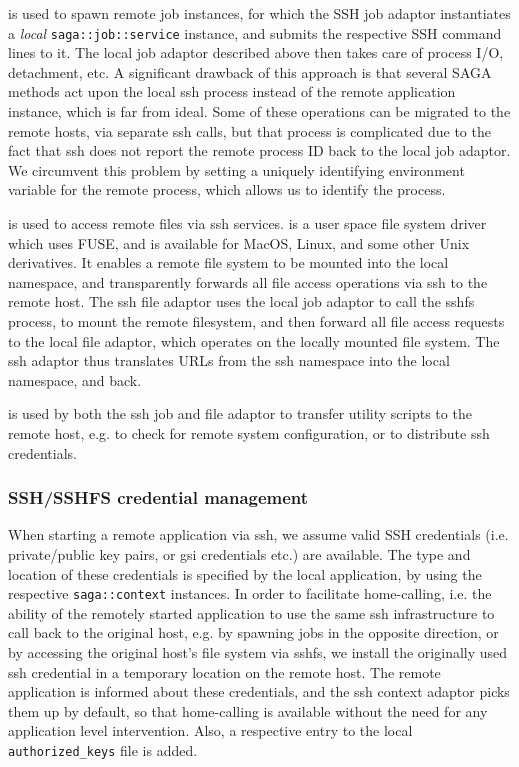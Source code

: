 \documentclass[3p,twocolumn]{elsarticle}
\newcommand{\T}[1]{\texttt{#1}}
\newcommand{\I}[1]{\textit{#1}}
\newcommand{\ssh}[1]{\texttt{ssh}}
\newcommand{\scp}[1]{\texttt{scp}}
\newcommand{\sshfs}[1]{\texttt{sshfs}}
\begin{document}
{\texttt{\ssh}} is used to spawn remote job instances, for which the
SSH job adaptor instantiates a \I{local} \T{saga::job::service}
instance, and submits the respective SSH command lines to it.  The
local job adaptor described above then takes care of process I/O,
detachment, etc.  A significant drawback of this approach is that
several SAGA methods act upon the local ssh process instead of the
remote application instance, which is far from ideal. Some of these
operations can be migrated to the remote hosts, via separate ssh
calls, but that process is complicated due to the fact that ssh does
not report the remote process ID back to the local job adaptor.  We
circumvent this problem by setting a uniquely identifying environment
variable for the remote process, which allows us to identify the process.

{\texttt{\sshfs}} is used to access remote files via ssh services.
{\texttt{\sshfs}} is a user space file system driver which uses FUSE,
and is available for MacOS, Linux, and some other Unix derivatives.
It enables a remote file system to be mounted into the local
namespace, and transparently forwards all file access operations via
ssh to the remote host.  The ssh file adaptor uses the local job
adaptor to call the sshfs process, to mount the remote filesystem, and
then forward all file access requests to the local file adaptor, which
operates on the locally mounted file system.  The ssh adaptor thus
translates URLs from the ssh namespace into the local namespace, and
back.

{\texttt{\scp}} is used by both the ssh job and file adaptor to
transfer utility scripts to the remote host, e.g. to check for remote
system configuration, or to distribute ssh credentials.

\subsubsection{SSH/SSHFS credential management}
When starting a remote application via ssh, we assume valid SSH
credentials (i.e. private/public key pairs, or gsi credentials etc.)
are available.  The type and location of these credentials is
specified by the local application, by using the respective
\T{saga::context} instances.  In order to facilitate home-calling,
i.e. the ability of the remotely started application to use the same
ssh infrastructure to call back to the original host, e.g. by spawning
jobs in the opposite direction, or by accessing the original host's
file system via sshfs, we install the originally used ssh credential
in a temporary location on the remote host. The remote application is
informed about these credentials, and the ssh context adaptor picks
them up by default, so that home-calling is available without the need
for any application level intervention.  Also, a respective entry to
the local \T{authorized\_keys} file is added.
\end{document}
